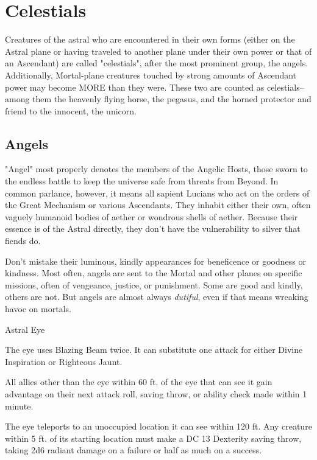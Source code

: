 \FloatBarrier
\section{Celestials}
Creatures of the astral who are encountered in their own forms (either on the Astral plane or having traveled to another plane under their own power or that of an Ascendant) are called "celestials", after the most prominent group, the angels. Additionally, Mortal-plane creatures touched by strong amounts of Ascendant power may become MORE than they were. These two are counted as celestials--among them the heavenly flying horse, the pegasus, and the horned protector and friend to the innocent, the unicorn.
\subsection{Angels}
"Angel" most properly denotes the members of the Angelic Hosts, those sworn to the endless battle to keep the universe safe from threats from Beyond. In common parlance, however, it means all sapient Lucians who act on the orders of the Great Mechanism or various Ascendants. They inhabit either their own, often vaguely humanoid bodies of aether or wondrous shells of aether. Because their essence is of the Astral directly, they don't have the vulnerability to silver that fiends do.

Don't mistake their luminous, kindly appearances for beneficence or goodness or kindness. Most often, angels are sent to the Mortal and other planes on specific missions, often of vengeance, justice, or punishment. Some are good and kindly, others are not. But angels are almost always \textit{dutiful}, even if that means wreaking havoc on mortals.

\begin{DndMonster}{Astral Eye}
	\DndMonsterBasics[armor-class={13}, hit-points={45}, speed={0 ft., fly 50 ft. (hover)}]
	\DndMonsterDetails[skills={Perception +9}, damage-resistances={fire, radiant}, senses={truesight 60 ft., blindsight 60 ft., passive Perception 19}, languages={all, telepathy 60 ft.}, challenge={1:1}]
	
	
	 The eye uses Blazing Beam twice. It can substitute one attack for either Divine Inspiration or Righteous Jaunt.
	
	\DndMonsterAttack[
		name=Blazing Beam,
		distance=ranged,
		type=spell,
		mod=+5,
		range=120 ft.,
		dmg=\DndDice{1d6+3},
		dmg-type=radiant
	]
	 All allies other than the eye within 60 ft. of the eye that can see it gain advantage on their next attack roll, saving throw, or ability check made within 1 minute.
	
	 The eye teleports to an unoccupied location it can see within 120 ft. Any creature within 5 ft. of its starting location must make a DC 13 Dexterity saving throw, taking 2d6 radiant damage on a failure or half as much on a success. 
\end{DndMonster}

